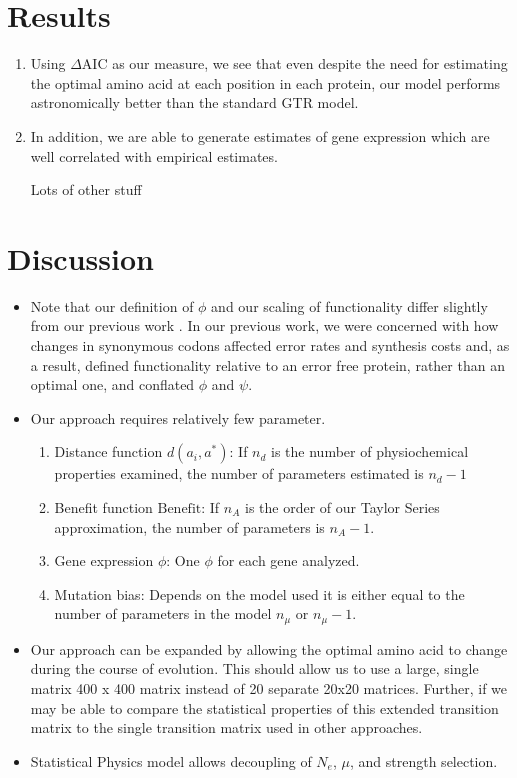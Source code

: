 \documentclass{article}
\newcommand{\Ne}{\ensuremath{{N_e}}\xspace}
\newcommand{\DeltaAIC}{\ensuremath{\Delta\text{AIC}}\xspace}
\newcommand{\aopt}{\ensuremath{a^*}\xspace}
\newcommand{\Func}{\ensuremath{\text{Benefit}}\xspace}
\begin{document}
\section*{Results}
\begin{enumerate}
\item Using \DeltaAIC as our measure, we see that even despite the need for estimating the optimal amino acid at each position in each protein, our model performs astronomically better than the standard GTR model.
\item In addition, we are able to generate estimates of gene expression which are well correlated with empirical estimates.
\item [Lots of other stuff]
\end{enumerate}
\section*{Discussion}

\begin{itemize}
\item Note that our definition of $\phi$ and our scaling of functionality differ slightly from our previous work \citep{Gilchrist07,GilchristEtAl09,ShahAndGilchrist11,GilchristEtAl15a}.
In our previous work, we were concerned with how changes in synonymous codons affected error rates and synthesis costs and, as a result, defined functionality relative to an error free protein, rather than an optimal one, and conflated $\phi$ and $\psi$.
\item Our approach requires relatively few parameter. 
  \begin{enumerate}
  \item Distance function $d(a_i, \aopt)$: If $n_d$ is the number of physiochemical properties examined, the number of parameters estimated is $n_d - 1$
  \item Benefit function $\Func$: If $n_A$ is the order of our Taylor Series approximation, the number of parameters is $n_A-1$.
  \item Gene expression $\phi$: One $\phi$ for each gene analyzed.
  \item Mutation bias: Depends on the model used it is either equal to the number of parameters in the model $n_\mu$ or $n_\mu-1$.
  \end{enumerate}
\item Our approach can be expanded by allowing the optimal amino acid to change during the course of evolution.
This should allow us to use a large, single matrix 400 x 400 matrix instead of 20 separate 20x20 matrices.
Further, if we may be able to compare the statistical properties of this extended transition matrix to the single transition matrix used in other approaches.
\item Statistical Physics model allows decoupling of \Ne, $\mu$, and strength selection.
\end{itemize}


\end{document}
